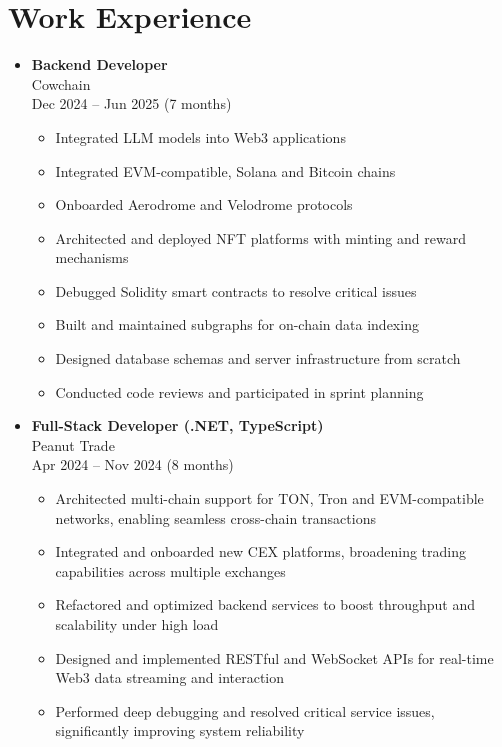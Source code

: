 \section{Work Experience}\label{sec:work-experience}
\begin{itemize}[noitemsep]
    \item \textbf{Backend Developer} \\
    Cowchain \\
    Dec 2024 -- Jun 2025 \;(7 months)
    \begin{itemize}[noitemsep]
        \item Integrated LLM models into Web3 applications
        \item Integrated EVM-compatible, Solana and Bitcoin chains
        \item Onboarded Aerodrome and Velodrome protocols
        \item Architected and deployed NFT platforms with minting and reward mechanisms
        \item Debugged Solidity smart contracts to resolve critical issues
        \item Built and maintained subgraphs for on-chain data indexing
        \item Designed database schemas and server infrastructure from scratch
        \item Conducted code reviews and participated in sprint planning
    \end{itemize}

    \item \textbf{Full-Stack Developer (.NET, TypeScript)} \\
    Peanut Trade \\
    Apr 2024 -- Nov 2024 \;(8 months)
    \begin{itemize}[noitemsep]
        \item Architected multi-chain support for TON, Tron and EVM-compatible networks, enabling seamless cross-chain transactions
        \item Integrated and onboarded new CEX platforms, broadening trading capabilities across multiple exchanges
        \item Refactored and optimized backend services to boost throughput and scalability under high load
        \item Designed and implemented RESTful and WebSocket APIs for real-time Web3 data streaming and interaction
        \item Performed deep debugging and resolved critical service issues, significantly improving system reliability
    \end{itemize}


\end{itemize}
